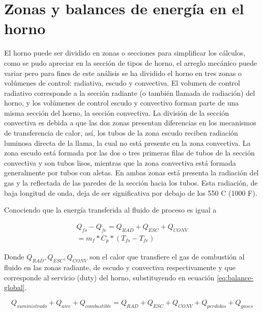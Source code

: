 \section{Zonas y balances de energía en el horno}

\par El horno puede ser dividido en zonas o secciones para simplificar los cálculos, como se pudo apreciar en la sección de tipos de horno, el arreglo mecánico puede variar pero para fines de este análisis se ha dividido el horno en tres zonas o volúmenes de control: radiativa, escudo y convectiva. El volumen de control radiativo corresponde a la sección radiante (o también llamada de radiación) del horno, y los volúmenes de control escudo y convectivo forman parte de una misma sección del horno, la sección convectiva. La división de la sección convectiva es debida a que las dos zonas presentan diferencias en los mecanismos de transferencia de calor, así, los tubos de la zona escudo reciben radiación luminosa directa de la llama,  la cual no está presente en la zona convectiva. La zona escudo está formada por las dos o tres primeras filas de tubos de la sección convectiva y son tubos lisos, mientras que la zona convectiva está formada generalmente por tubos con aletas. En ambas zonas está presenta la radiación del gas y la reflectada de las paredes de la sección hacia los tubos. Esta radiación, de baja longitud de onda, deja de ser significativa por debajo de los 550 C (1000 F).
 
\par Conociendo que la energía transferida al fluido de proceso es igual a

\begin{equation}
    \begin{gathered}
    Q_{fs} - Q_{fe} = Q_{RAD} + Q_{ESC} + Q_{CONV}\\
               	    = m_f * C_p * (T_{fs} - T_{fe})
    \end{gathered}
\end{equation}

\par Donde $Q_{RAD}, Q_{ESC}, Q_{CONV}$ son el calor que transfiere el gas de combustión al fluido en las zonas radiante, de escudo y convectiva respectivamente y que corresponde al servicio (duty) del horno, substituyendo en ecuación \ref{eq:balance-global}.

\begin{equation}
    Q_{suministrado} + Q_{aire} + Q_{combustible} = Q_{RAD} + Q_{ESC} + Q_{CONV} + Q_{perdidas} + Q_{gases}
\end{equation}

